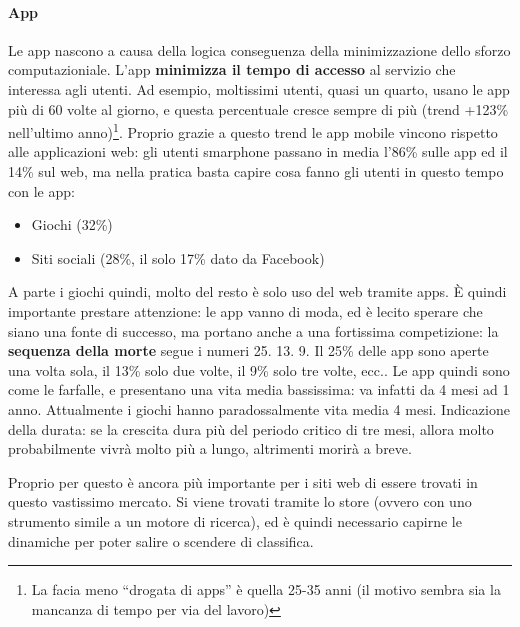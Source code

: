 \paragraph*{App}Le app nascono a causa della logica conseguenza della minimizzazione dello sforzo computazioniale. L'app \textbf{minimizza il tempo di accesso} al servizio che interessa agli utenti. Ad esempio, moltissimi utenti, quasi un quarto, usano le app pi\`u di 60 volte al giorno, e questa percentuale cresce sempre di pi\`u (trend +123\% nell'ultimo anno)\footnote{La facia meno ``drogata di apps'' \`e quella 25-35 anni (il motivo sembra sia la mancanza di tempo per via del lavoro)}. Proprio grazie a questo trend le app mobile vincono rispetto alle applicazioni web: gli utenti smarphone passano in media l'86\% sulle app ed il 14\% sul web, ma nella pratica basta capire cosa fanno gli utenti in questo tempo con le app:
\begin{itemize}

\item Giochi (32\%)
\item Siti sociali (28\%, il solo 17\% dato da Facebook)
  
\end{itemize}
A parte i giochi quindi, molto del resto \`e solo uso del web tramite apps. \`E quindi importante prestare attenzione: le app vanno di moda, ed \`e lecito sperare che siano una fonte di successo, ma portano anche a una fortissima competizione: la \textbf{sequenza della morte} segue i numeri 25. 13. 9. Il 25\% delle app sono aperte una volta sola, il 13\% solo due volte, il 9\% solo tre volte, ecc..
Le app quindi sono come le farfalle, e presentano una vita media bassissima: va infatti da 4 mesi ad 1 anno. Attualmente i giochi hanno paradossalmente vita media 4 mesi. Indicazione della durata: se la crescita dura pi\`u del periodo critico di tre mesi, allora molto probabilmente vivr\`a molto pi\`u a lungo, altrimenti morir\`a a breve.

Proprio per questo \`e ancora pi\`u importante per i siti web di essere trovati in questo vastissimo mercato. Si viene trovati tramite lo store (ovvero con uno strumento simile a un motore di ricerca), ed \`e quindi necessario capirne le dinamiche per poter salire o scendere di classifica.

